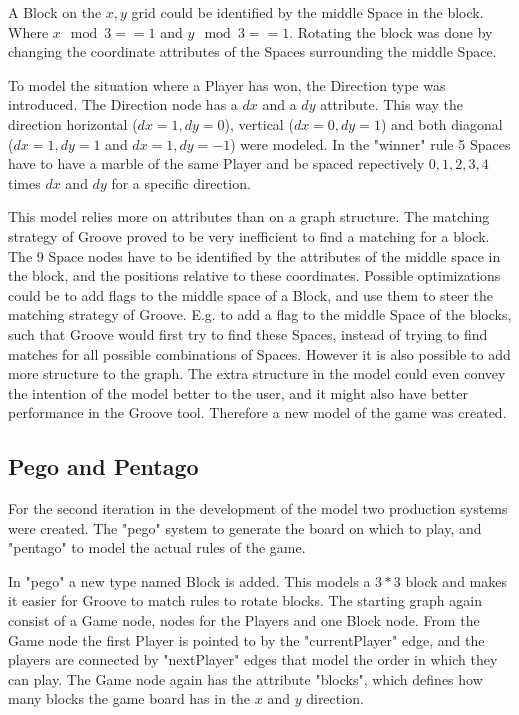 A Block on the $x,y$ grid could be identified by the middle Space in the block. Where $x\mod3==1$ and $y\mod3==1$.
Rotating the block was done by changing the coordinate attributes of the Spaces surrounding the middle Space.

To model the situation where a Player has won, the Direction type was introduced. The Direction node has a $dx$ and a $dy$ attribute.
This way the direction horizontal ($dx=1,dy=0$), vertical ($dx=0,dy=1$) and both diagonal ($dx=1,dy=1$ and $dx=1,dy=-1$) were modeled. 
In the "winner" rule 5 Spaces have to have a marble of the same Player and be spaced repectively $0,1,2,3,4$ times $dx$ and $dy$ for a specific direction.

This model relies more on attributes than on a graph structure.
The matching strategy of Groove proved to be very inefficient to find a matching for a block. The 9 Space nodes have to be identified by the attributes of the middle space in the block, and the positions relative to these coordinates.
Possible optimizations could be to add flags to the middle space of a Block, and use them to steer the matching strategy of Groove. E.g. to add a flag to the middle Space of the blocks, such that Groove would first try to find these Spaces, instead of trying to find matches for all possible combinations of Spaces.
However it is also possible to add more structure to the graph. 
The extra structure in the model could even convey the intention of the model better to the user, and it might also have better performance in the Groove tool. Therefore a new model of the game was created.

\subsection{Pego and Pentago}

For the second iteration in the development of the model two production systems were created. The "pego" system to generate the board on which to play, and "pentago" to model the actual rules of the game.

In "pego" a new type named Block is added. This models a $3*3$ block and makes it easier for Groove to match rules to rotate blocks.
The starting graph again consist of a Game node, nodes for the Players and one Block node. From the Game node the first Player is pointed to by the "currentPlayer" edge, and the players are connected by "nextPlayer" edges that model the order in which they can play.
The Game node again has the attribute "blocks", which defines how many blocks the game board has in the $x$ and $y$ direction.

